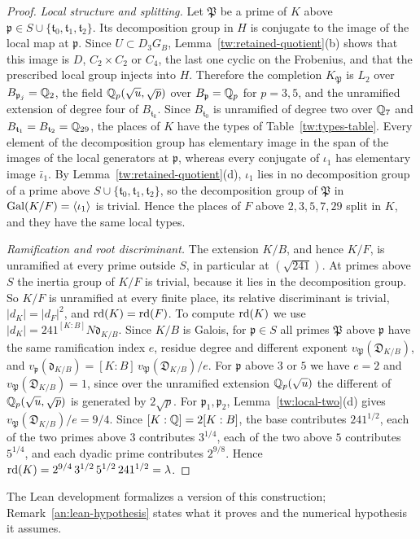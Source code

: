 \begin{proof}
\emph{Local structure and splitting.} Let $\mathfrak P$ be a prime of $K$
above $\mathfrak p\in S\cup\{\mathfrak t_0,\mathfrak t_1,\mathfrak t_2\}$. Its
decomposition group in $H$ is conjugate to the image of the local map at
$\mathfrak p$. Since $U\subset D_3G_B$, Lemma~\ref{tw:retained-quotient}(b)
shows that this image is $D$, $C_2\times C_2$ or $C_4$, the last one cyclic on
the Frobenius, and that the prescribed local group injects into $H$.
Therefore the completion $K_{\mathfrak P}$ is $L_2$ over
$B_{\mathfrak p_j}=\mathbb Q_2$, the field $\mathbb Q_p(\sqrt u,\sqrt p)$ over
$B_{\mathfrak p}=\mathbb Q_p$ for $p=3,5$, and the unramified extension of degree
four of $B_{\mathfrak t_k}$. Since $B_{\mathfrak t_0}$ is unramified of
degree two over $\mathbb Q_7$ and $B_{\mathfrak t_1}=B_{\mathfrak t_2}=\mathbb Q_{29}$, the
places of $K$ have the types of Table~\ref{tw:types-table}. Every element of
the decomposition group has elementary image in the span of the images of the
local generators at $\mathfrak p$, whereas every conjugate of $\iota_1$ has
elementary image $\bar\iota_1$. By Lemma~\ref{tw:retained-quotient}(d),
$\iota_1$ lies in no decomposition group of a prime above
$S\cup\{\mathfrak t_0,\mathfrak t_1,\mathfrak t_2\}$, so the decomposition
group of $\mathfrak P$ in $\operatorname{Gal}(K/F)=\langle\iota_1\rangle$ is trivial. Hence
the places of $F$ above $2,3,5,7,29$ split in $K$, and they have the same
local types.

\emph{Ramification and root discriminant.} The extension $K/B$, and hence
$K/F$, is unramified at every prime outside $S$, in particular at
$(\sqrt{241})$. At primes above $S$ the inertia group of $K/F$ is trivial,
because it lies in the decomposition group. So $K/F$ is unramified at every
finite place, its relative discriminant is trivial, $|d_K|=|d_F|^2$, and
$\operatorname{rd}(K)=\operatorname{rd}(F)$. To compute $\operatorname{rd}(K)$ we use
$|d_K|=241^{[K:B]}N\mathfrak d_{K/B}$. Since $K/B$ is Galois, for
$\mathfrak p\in S$ all primes $\mathfrak P$ above $\mathfrak p$ have the same
ramification index $e$, residue degree and different exponent
$v_{\mathfrak P}(\mathfrak D_{K/B})$, and
$v_{\mathfrak p}(\mathfrak d_{K/B})=[K:B]\,v_{\mathfrak P}(\mathfrak D_{K/B})/e$.
For $\mathfrak p$ above $3$ or $5$ we have $e=2$ and
$v_{\mathfrak P}(\mathfrak D_{K/B})=1$, since over the unramified extension
$\mathbb Q_p(\sqrt u)$ the different of $\mathbb Q_p(\sqrt u,\sqrt p)$ is generated by
$2\sqrt p$. For $\mathfrak p_1,\mathfrak p_2$, Lemma~\ref{tw:local-two}(d)
gives $v_{\mathfrak P}(\mathfrak D_{K/B})/e=9/4$. Since $[K:\mathbb Q]=2[K:B]$, the
base contributes $241^{1/2}$, each of the two primes above $3$ contributes
$3^{1/4}$, each of the two above $5$ contributes $5^{1/4}$, and each dyadic
prime contributes $2^{9/8}$. Hence
$\operatorname{rd}(K)=2^{9/4}\,3^{1/2}\,5^{1/2}\,241^{1/2}=\lambda$.
\end{proof}

\begin{remark}\label{tw:lean-remark}
The Lean development \cite{NaslundLean2026} formalizes a version of this
construction; Remark~\ref{an:lean-hypothesis} states what it proves and the
numerical hypothesis it assumes.
\end{remark}
